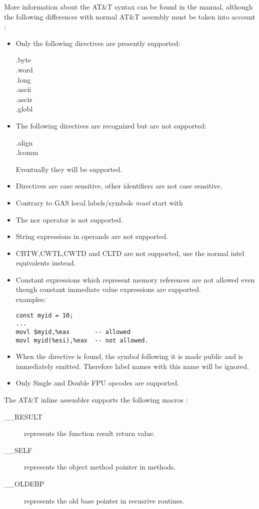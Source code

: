 \documentclass{report}
\begin{document}
More information about the AT\&T syntax can be found in the  manual,
although the following differences with normal AT\&T assembly must be taken
into account :
\begin{itemize}
\item  Only the following directives are presently supported:
 \begin{description}
\item[.byte]
\item[.word]
\item[.long]
\item[.ascii]
\item[.asciz]
\item[.globl]
\end{description}
\item  The following directives are recognized but are not
   supported:
\begin{description}
\item[.align]
\item[.lcomm]
\end{description}
Eventually they will be supported.
\item Directives are case sensitive, other identifiers are not case sensitive.
\item  Contrary to GAS local labels/symbols {\em must} start with 
\item  The nor operator  is not supported.
\item  String expressions in operands are not supported.
\item  CBTW,CWTL,CWTD and CLTD are not supported, use the normal intel
equivalents instead.
\item  Constant expressions which represent memory references are not
allowed even though constant immediate value expressions are supported. \\
examples:
\begin{verbatim}
const myid = 10;
...
movl $myid,%eax       -- allowed
movl myid(%esi),%eax  -- not allowed.
\end{verbatim}
\item When the  directive is found, the symbol following
    it is made public and is immediately emitted.
    Therefore label names with this name will be ignored.
\item  Only Single and Double FPU opcodes are supported.
\end{itemize}

The AT\&T inline assembler supports the following macros :
\begin{description}
\item [\_\_RESULT] represents the function result return value.
\item [\_\_SELF]   represents the object method pointer in methods.
\item [\_\_OLDEBP] represents the old base pointer in recusrive routines.
\end{description}
\end{document}
